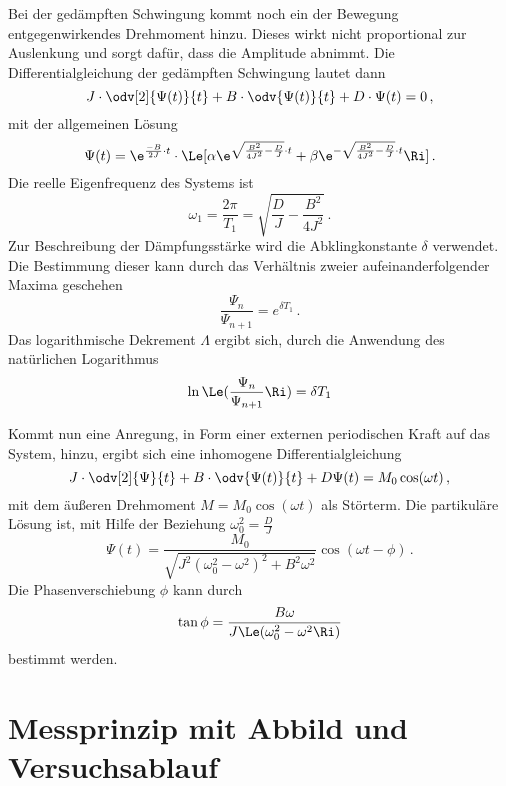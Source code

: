 \documentclass[
12pt,
a4paper,
bibliography=totocnumbered, %
BCOR=1cm, %
oneside, %
]{scrartcl}
\begin{document}
Bei der gedämpften Schwingung kommt noch ein der Bewegung entgegenwirkendes Drehmoment hinzu. Dieses wirkt nicht proportional zur Auslenkung und sorgt dafür, dass die Amplitude abnimmt. Die Differentialgleichung der gedämpften Schwingung lautet dann
\begin{equation}
	J \cdot \odv[2]{\Psi(t)}{t} + B \cdot \odv{\Psi(t)}{t} + D \cdot \Psi(t) = 0 \,,
\end{equation}
mit der allgemeinen Lösung
\begin{equation}
	\Psi(t) = \e^{\frac{-B}{2J} \cdot t} \cdot \Le[\alpha \e^{\sqrt{\frac{B^2}{4J^2} - \frac{D}{J}}\cdot t} + \beta \e^{-\sqrt{\frac{B^2}{4J^2} - \frac{D}{J}}\cdot t}\Ri] \,.
\end{equation}
Die reelle Eigenfrequenz des Systems ist
\begin{equation}
	\omega_1=\frac{2 \pi}{T_1}=\sqrt{\frac{D}{J}-\frac{B^2}{4J^2}} \,.
\end{equation}
Zur Beschreibung der Dämpfungsstärke wird die Abklingkonstante $\delta$ verwendet. Die Bestimmung dieser kann durch das Verhältnis zweier aufeinanderfolgender Maxima geschehen
\begin{equation}
	\frac{\Psi_n}{\Psi_{n+1}}=e^{\delta T_1} \,.
\end{equation}
Das logarithmische Dekrement \(\Lambda\) ergibt sich, durch die Anwendung des natürlichen Logarithmus
\begin{equation}
	\ln\Le(\frac{\Psi_n}{\Psi_{n+1}}\Ri) = \delta T_1
\end{equation}

Kommt nun eine Anregung, in Form einer externen periodischen Kraft auf das System, hinzu, ergibt sich eine inhomogene Differentialgleichung
\begin{equation}
	J \cdot \odv[2]{\Psi}{t} + B \cdot \odv{\Psi(t)}{t} + D\Psi(t)=M_0\cos(\omega t) \,,
\end{equation}
mit dem äußeren Drehmoment \(M = M_0 \cos(\omega t)\) als Störterm. Die partikuläre Lösung ist, mit Hilfe der Beziehung \(\omega^2_0 = \frac{D}{J}\)
\begin{equation}
	\Psi(t) = \frac{M_0}{\sqrt{J^2(\omega^2_0 - \omega^2)^2 + B^2\omega^2}}\cos(\omega t - \phi) \,.
\end{equation}
Die Phasenverschiebung \(\phi\) kann durch
\begin{equation}
	\tan\phi=\frac{B\omega}{J\Le(\omega^2_0 - \omega^2\Ri)}
\end{equation}
bestimmt werden.

\section[Messprinzip]{Messprinzip mit Abbild und Versuchsablauf}
\end{document}
